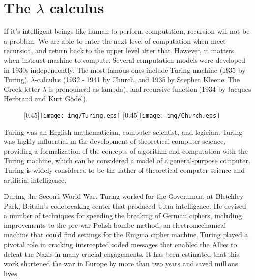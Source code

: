 \documentclass{article}
\begin{document}
\section{The $\lambda$ calculus}

If it's intelligent beings like human to perform computation, recursion will not be a problem. We are able to enter the next level of computation when meet recursion, and return back to the upper level after that. However, it matters when instruct machine to compute. Several computation models were developed in 1930s independently. The most famous ones include Turing machine (1935 by Turing), $\lambda$-calculus (1932 - 1941 by Church, and 1935 by Stephen Kleene. The Greek letter $\lambda$ is pronounced as lambda), and recursive function (1934 by Jacques Herbrand and Kurt Gödel).

\begin{figure}[htbp]
 \centering
 [0.45\linewidth]{\texttt{[image: img/Turing.eps]}} \quad
 [0.45\linewidth]{\texttt{[image: img/Church.eps]}}
 \captionsetup{labelformat=empty}
 \label{fig:Turing}
 \label{fig:Church}
\end{figure}

Turing was an English mathematician, computer scientist, and logician. Turing was highly influential in the development of theoretical computer science, providing a formalization of the concepts of algorithm and computation with the Turing machine, which can be considered a model of a general-purpose computer. Turing is widely considered to be the father of theoretical computer science and artificial intelligence\cite{wiki-Turing}.

During the Second World War, Turing worked for the Government at Bletchley Park, Britain's codebreaking center that produced Ultra intelligence. He devised a number of techniques for speeding the breaking of German ciphers, including improvements to the pre-war Polish bombe method, an electromechanical machine that could find settings for the Enigma cipher machine. Turing played a pivotal role in cracking intercepted coded messages that enabled the Allies to defeat the Nazis in many crucial engagements. It has been estimated that this work shortened the war in Europe by more than two years and saved millions lives.
\end{document}
